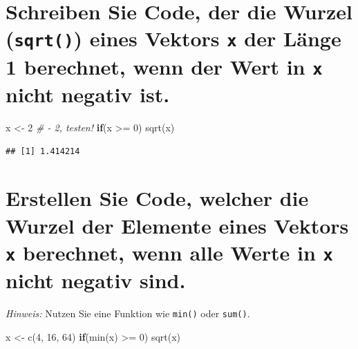 \documentclass[12pt,a4paper]{article}
\newenvironment{Shaded}{\begin{snugshade}}{\end{snugshade}}
\newcommand{\CommentTok}[1]{\textcolor[rgb]{0.56,0.35,0.01}{\textit{#1}}}
\newcommand{\ControlFlowTok}[1]{\textcolor[rgb]{0.13,0.29,0.53}{\textbf{#1}}}
\newcommand{\DecValTok}[1]{\textcolor[rgb]{0.00,0.00,0.81}{#1}}
\newcommand{\FunctionTok}[1]{\textcolor[rgb]{0.00,0.00,0.00}{#1}}
\newcommand{\NormalTok}[1]{#1}
\newcommand{\OtherTok}[1]{\textcolor[rgb]{0.56,0.35,0.01}{#1}}
\newcommand{\SpecialCharTok}[1]{\textcolor[rgb]{0.00,0.00,0.00}{#1}}
\begin{document}
\hypertarget{schreiben-sie-code-der-die-wurzel-eines-vektors-der-luxe4nge-1-berechnet-wenn-der-wert-in-nicht-negativ-ist.}{%
\section{\texorpdfstring{Schreiben Sie Code, der die Wurzel
(\texttt{sqrt()}) eines Vektors \texttt{x} der Länge 1 berechnet, wenn
der Wert in \texttt{x} nicht negativ
ist.}{Schreiben Sie Code, der die Wurzel () eines Vektors  der Länge 1 berechnet, wenn der Wert in  nicht negativ ist.}}\label{schreiben-sie-code-der-die-wurzel-eines-vektors-der-luxe4nge-1-berechnet-wenn-der-wert-in-nicht-negativ-ist.}}

\begin{Shaded}
\begin{Highlighting}[]
\NormalTok{    x }\OtherTok{\textless{}{-}} \DecValTok{2} \CommentTok{\# {-} 2, testen!}
    \ControlFlowTok{if}\NormalTok{(x }\SpecialCharTok{\textgreater{}=} \DecValTok{0}\NormalTok{) }\FunctionTok{sqrt}\NormalTok{(x)}
\end{Highlighting}
\end{Shaded}

\begin{verbatim}
## [1] 1.414214
\end{verbatim}

\hypertarget{erstellen-sie-code-welcher-die-wurzel-der-elemente-eines-vektors-berechnet-wenn-alle-werte-in-nicht-negativ-sind.}{%
\section{\texorpdfstring{Erstellen Sie Code, welcher die Wurzel der
Elemente eines Vektors \texttt{x} berechnet, wenn alle Werte in
\texttt{x} nicht negativ
sind.}{Erstellen Sie Code, welcher die Wurzel der Elemente eines Vektors  berechnet, wenn alle Werte in  nicht negativ sind.}}\label{erstellen-sie-code-welcher-die-wurzel-der-elemente-eines-vektors-berechnet-wenn-alle-werte-in-nicht-negativ-sind.}}

\emph{Hinweis:} Nutzen Sie eine Funktion wie \texttt{min()} oder
\texttt{sum()}.

\begin{Shaded}
\begin{Highlighting}[]
\NormalTok{    x }\OtherTok{\textless{}{-}} \FunctionTok{c}\NormalTok{(}\DecValTok{4}\NormalTok{, }\DecValTok{16}\NormalTok{, }\DecValTok{64}\NormalTok{)}
    \ControlFlowTok{if}\NormalTok{(}\FunctionTok{min}\NormalTok{(x) }\SpecialCharTok{\textgreater{}=} \DecValTok{0}\NormalTok{) }\FunctionTok{sqrt}\NormalTok{(x)}
\end{Highlighting}
\end{Shaded}
\end{document}
